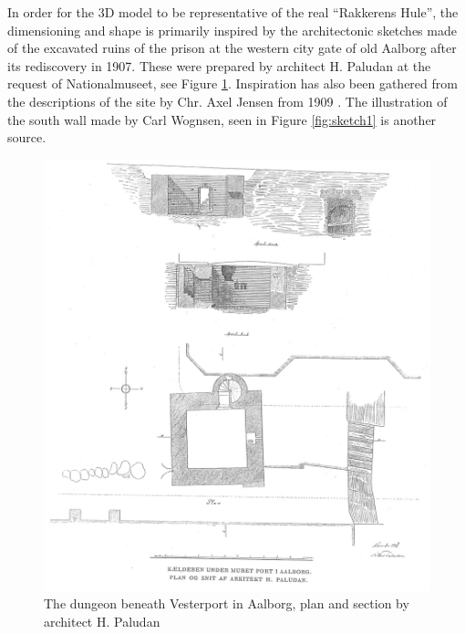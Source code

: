 In order for the 3D model to be representative of the real “Rakkerens Hule”, the dimensioning and shape is primarily inspired by the architectonic sketches made of the excavated ruins of the prison at the western city gate of old Aalborg after its rediscovery in 1907. These were prepared by architect H. Paludan at the request of Nationalmuseet, see Figure \ref{fig:sketch0}. Inspiration has also been gathered from the descriptions of the site by Chr. Axel Jensen from 1909 \cite{Jensen1909}. The illustration of the south wall made by Carl Wognsen\cite{Riismoller1961}, seen in Figure \ref{fig:sketch1} is another source.


\begin{figure}
    \centering
    \includegraphics[width=\textwidth]{figures/sketch0.jpg}
	\caption{The dungeon beneath Vesterport in Aalborg, plan and section by architect H. Paludan \cite{Jensen1909}}\label{fig:sketch0}
\end{figure}

